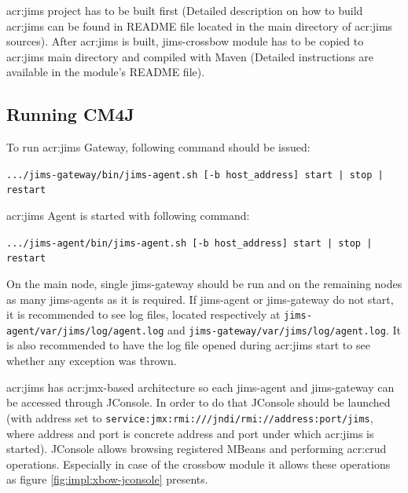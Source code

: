 \documentclass[11pt,openany]{book}
\begin{document}
        \gls{acr:jims} project has to be built first (Detailed description on how to build \gls{acr:jims} can be found
        in README file located in the main directory of \gls{acr:jims} sources). After \gls{acr:jims} is built,
        jims-crossbow module has to be copied to \gls{acr:jims} main directory and compiled with Maven (Detailed
        instructions are available in the module's README file).
        

      \subsection{Running CM4J}

        To run \gls{acr:jims} Gateway, following command should be issued:

        \texttt{.../jims-gateway/bin/jims-agent.sh [-b host\_address] start | stop | restart}

        \noindent
        \gls{acr:jims} Agent is started with following command:

        \texttt{.../jims-agent/bin/jims-agent.sh [-b host\_address] start | stop | restart}

        On the main node, single jims-gateway should be run and on the remaining nodes as many jims-agents as it is
        required. If jims-agent or jims-gateway do not start, it is recommended to see log files, located respectively
        at \texttt{jims-agent/var/jims/log/agent.log} and \texttt{jims-gateway/var/jims/log/agent.log}. It is also
        recommended to have the log file opened during \gls{acr:jims} start to see whether any exception was thrown.

        \gls{acr:jims} has \gls{acr:jmx}-based architecture so each jims-agent and jims-gateway can be accessed through
        JConsole. In order to do that JConsole should be launched (with address set to
        \texttt{service:jmx:rmi:///jndi/rmi://address:port/jims}, where address and port is concrete address and port
        under which \gls{acr:jims} is started). JConsole allows browsing registered MBeans and performing \gls{acr:crud}
        operations. Especially in case of the crossbow module it allows these operations as figure
        \ref{fig:impl:xbow-jconsole} presents.
\end{document}

